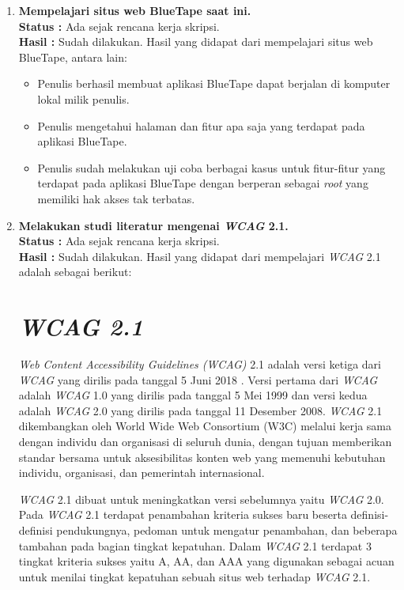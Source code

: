 \documentclass[a4paper,twoside]{article}
\begin{document}
	\begin{enumerate}
		\item \textbf{Mempelajari situs web BlueTape saat ini.}\\
		{\bf Status :} Ada sejak rencana kerja skripsi.\\
		{\bf Hasil :} Sudah dilakukan. Hasil yang didapat dari mempelajari situs web BlueTape, antara lain:
		\begin{itemize}
			\item Penulis berhasil membuat aplikasi BlueTape dapat berjalan di komputer lokal milik penulis. 
			\item Penulis mengetahui halaman dan fitur apa saja yang terdapat pada aplikasi BlueTape.
			\item Penulis sudah melakukan uji coba berbagai kasus untuk fitur-fitur yang terdapat pada aplikasi BlueTape dengan berperan sebagai \textit{root} yang memiliki hak akses tak terbatas. 
		\end{itemize}
		
		\item \textbf{Melakukan studi literatur mengenai \textit{WCAG} 2.1.}\\
		{\bf Status :} Ada sejak rencana kerja skripsi.\\
		{\bf Hasil :} Sudah dilakukan. Hasil yang didapat dari mempelajari \textit{WCAG} 2.1 adalah sebagai berikut:

		\section*{\textit{WCAG 2.1}}
		\label{sec:wcag_2.1} 
		\textit{Web Content Accessibility Guidelines (WCAG)} 2.1 adalah versi ketiga dari \textit{WCAG} yang dirilis pada tanggal 5 Juni 2018 \cite{WCAG:2.1}. Versi pertama dari \textit{WCAG} adalah \textit{WCAG} 1.0 yang dirilis pada tanggal 5 Mei 1999 dan versi kedua adalah \textit{WCAG} 2.0 yang dirilis pada tanggal 11 Desember 2008. \textit{WCAG} 2.1 dikembangkan oleh World Wide Web Consortium (W3C) melalui kerja sama dengan individu dan organisasi di seluruh dunia, dengan tujuan memberikan standar bersama untuk aksesibilitas konten web yang memenuhi kebutuhan individu, organisasi, dan pemerintah internasional. 

		\textit{WCAG} 2.1 dibuat untuk meningkatkan versi sebelumnya yaitu \textit{WCAG} 2.0. Pada \textit{WCAG} 2.1 terdapat penambahan kriteria sukses baru beserta definisi-definisi pendukungnya, pedoman untuk mengatur penambahan, dan beberapa tambahan pada bagian tingkat kepatuhan. Dalam \textit{WCAG} 2.1 terdapat 3 tingkat kriteria sukses yaitu A, AA, dan AAA yang digunakan sebagai acuan untuk menilai tingkat kepatuhan sebuah situs web terhadap \textit{WCAG} 2.1.


\end{enumerate}
\end{document}
